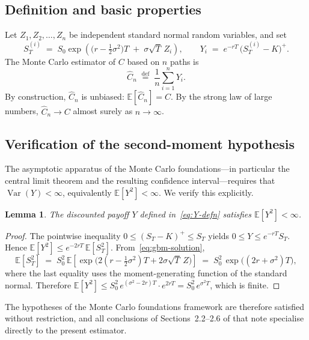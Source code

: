 \documentclass[11pt,a4paper]{article}
\theoremstyle{plain}
\newtheorem{lemma}[theorem]{Lemma}
\theoremstyle{definition}
\theoremstyle{remark}
\newcommand{\E}{\mathbb{E}}
\newcommand{\Var}{\operatorname{Var}}
\newcommand{\eqdef}{\overset{\mathrm{def}}{=}}
\begin{document}
\subsection{Definition and basic properties}

Let $Z_1, Z_2, \dots, Z_n$ be independent standard normal random
variables, and set
\begin{equation}
\label{eq:Si}
S_T^{(i)} \;=\; S_0 \exp\!\left(
\big(r - \tfrac{1}{2}\sigma^2\big) T \;+\; \sigma\sqrt{T}\, Z_i
\right),
\qquad
Y_i \;=\; e^{-rT}\,\big(S_T^{(i)} - K\big)^{+}.
\end{equation}
The Monte Carlo estimator of $C$ based on $n$ paths is
\begin{equation}
\label{eq:estimator}
\hat{C}_n \;\eqdef\; \frac{1}{n} \sum_{i=1}^{n} Y_i.
\end{equation}
By construction, $\hat{C}_n$ is unbiased: $\E[\hat{C}_n] = C$. By the
strong law of large numbers,
$\hat{C}_n \to C$ almost surely as $n \to \infty$.

\subsection{Verification of the second-moment hypothesis}
\label{sec:second-moment}

The asymptotic apparatus of the Monte Carlo foundations---in particular
the central limit
theorem and the resulting confidence interval---requires that
$\Var(Y) < \infty$, equivalently $\E[Y^2] < \infty$. We verify this
explicitly.

\begin{lemma}
\label{lem:second-moment}
The discounted payoff $Y$ defined in~\eqref{eq:Y-defn} satisfies
$\E[Y^2] < \infty$.
\end{lemma}

\begin{proof}
The pointwise inequality $0 \leq (S_T - K)^+ \leq S_T$ yields
$0 \leq Y \leq e^{-rT} S_T$. Hence
$\E[Y^2] \leq e^{-2rT}\, \E[S_T^2]$. From~\eqref{eq:gbm-solution},
\[
\E[S_T^2] \;=\; S_0^2\, \E\!\left[
\exp\!\big(2(r - \tfrac{1}{2}\sigma^2) T + 2\sigma\sqrt{T}\, Z\big)
\right]
\;=\; S_0^2\, \exp\!\big((2r + \sigma^2) T\big),
\]
where the last equality uses the moment-generating function of the
standard normal. Therefore
$\E[Y^2] \leq S_0^2\, e^{(\sigma^2 - 2r) T} \cdot e^{2rT}
= S_0^2\, e^{\sigma^2 T}$, which is finite.
\end{proof}

The hypotheses of the Monte Carlo foundations framework are therefore
satisfied without
restriction, and all conclusions of Sections~2.2--2.6 of that note
specialise directly to the present estimator.
\end{document}
